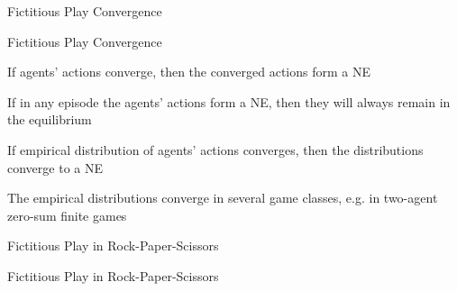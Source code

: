 
\begin{frame}{Fictitious Play Convergence}
    \begin{custombox}{Fictitious Play Convergence}
        \blist
            \itemsep=10pt
            \item<1-> If agents' actions converge, then the converged actions form a NE
            \item<2-> If in any episode the agents' actions form a NE, then they will always remain in the equilibrium
            \item<3-> If empirical distribution of agents' actions converges, then the distributions converge to a NE
            \item<4-> The empirical distributions converge in several game classes, e.g. in two-agent zero-sum finite games
        \elist
    \end{custombox}
\end{frame}

\begin{frame}[t]{Fictitious Play in Rock-Paper-Scissors}
    \centering
\end{frame}

\begin{frame}{Fictitious Play in Rock-Paper-Scissors}
    \centering
\end{frame}
 
